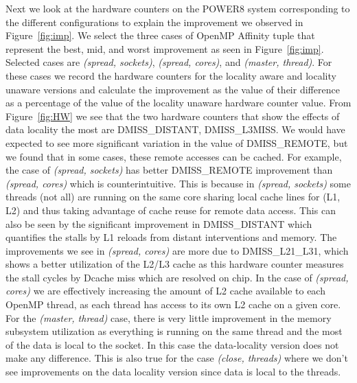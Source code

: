 %
Next we look at the hardware counters on the POWER8 system corresponding to the different configurations to explain the improvement we observed in Figure~\ref{fig:imp}.
We select the three cases of OpenMP Affinity tuple that represent the best, mid, and worst improvement as seen in Figure~\ref{fig:imp}. 
Selected cases are \textit{(spread, sockets)},  \textit{(spread, cores)}, and \textit{(master, thread)}. 
For these cases we record the hardware counters for the locality aware and locality unaware versions and calculate the improvement as the value of their difference as a percentage of the value of the locality unaware hardware counter value. 
From Figure~\ref{fig:HW} we see that the two hardware counters that show the effects of data locality the most are DMISS\_DISTANT, DMISS\_L3MISS.
We would have expected to see more significant variation in the value of DMISS\_REMOTE, but we found that in some cases, these remote accesses can be cached.
For example, the case of \textit{(spread, sockets)} has better DMISS\_REMOTE improvement than  \textit{(spread, cores)} which is counterintuitive. 
This is because in \textit{(spread, sockets)} some threads (not all) are running on the same core sharing local cache lines for (L1, L2) and thus taking advantage of cache reuse for remote data access. 
This can also be seen by the significant improvement in DMISS\_DISTANT which quantifies the stalls by L1 reloads from distant interventions and memory. 
The improvements we see in \textit{(spread, cores)} are more due to DMISS\_L21\_L31, which shows a better utilization of the L2/L3 cache as this hardware counter measures the stall cycles by Dcache miss which are resolved on chip. 
In the case of  \textit{(spread, cores)} we are effectively increasing the amount of 
L2 cache available to each OpenMP thread, as each thread has access to its own L2 cache on a given core. 
For the \textit{(master, thread)} case, there is very little improvement in the memory subsystem utilization as everything is running on the same thread and the most of the data is local to the socket. In this case the data-locality version does not make any difference. This is also true for the case  \textit{(close, threads)} where
 we don't see improvements on the data locality version since data is local to the threads.
